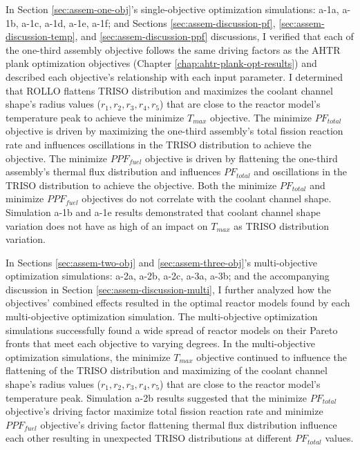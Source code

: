 In Section \ref{sec:assem-one-obj}'s single-objective optimization simulations: 
a-1a, a-1b, a-1c, a-1d, a-1e, a-1f; and Sections \ref{sec:assem-discussion-pf}, 
\ref{sec:assem-discussion-temp}, and \ref{sec:assem-discussion-ppf} discussions,    
I verified that each of the one-third assembly objective follows the same driving 
factors as the \gls{AHTR} plank optimization objectives (Chapter 
\ref{chap:ahtr-plank-opt-results}) and described each objective's relationship with 
each input parameter. 
I determined that \gls{ROLLO} flattens TRISO distribution and maximizes the coolant 
channel shape's radius values ($r_1, r_2, r_3, r_4, r_5$) that are close to the 
reactor model's temperature peak to achieve the minimize $T_{max}$ objective. 
The minimize $PF_{total}$ objective is driven by maximizing the one-third assembly's 
total fission reaction rate and influences oscillations in the TRISO distribution to 
achieve the objective. 
The minimize $PPF_{fuel}$ objective is driven by flattening the one-third assembly's 
thermal flux distribution and influences $PF_{total}$ and oscillations in the TRISO 
distribution to achieve the objective. 
Both the minimize $PF_{total}$ and minimize $PPF_{fuel}$ objectives do not correlate
with the coolant channel shape. 
Simulation a-1b and a-1e results demonstrated that coolant channel shape variation does 
not have as high of an impact on $T_{max}$ as \gls{TRISO} distribution variation.

In Sections \ref{sec:assem-two-obj} and \ref{sec:assem-three-obj}'s multi-objective 
optimization simulations: a-2a, a-2b, a-2c, a-3a, a-3b; and the accompanying 
discussion in Section \ref{sec:assem-discussion-multi}, I further 
analyzed how the objectives' combined effects resulted in the optimal reactor models 
found by each multi-objective optimization simulation. 
The multi-objective optimization simulations successfully found a wide spread of 
reactor models on their Pareto fronts that meet each objective to varying degrees. 
In the multi-objective optimization simulations, the minimize $T_{max}$ objective 
continued to influence the flattening of the TRISO distribution and maximizing of 
the coolant channel shape's radius values ($r_1, r_2, r_3, r_4, r_5$) that are close 
to the reactor model's temperature peak. 
Simulation a-2b results suggested that the minimize $PF_{total}$ 
objective's driving factor maximize total fission reaction rate and 
minimize $PPF_{fuel}$ objective's driving factor flattening thermal flux distribution 
influence each other resulting in unexpected TRISO distributions at different 
$PF_{total}$ values. 

